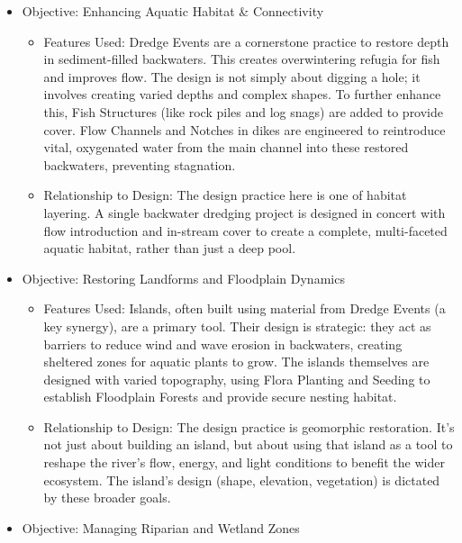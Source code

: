 \documentclass[
  letterpaper,
  DIV=11,
  numbers=noendperiod]{scrreprt}
\begin{document}
\begin{itemize}
\item
  Objective: Enhancing Aquatic Habitat \& Connectivity

  \begin{itemize}
  \item
    Features Used: Dredge Events are a cornerstone practice to restore
    depth in sediment-filled backwaters. This creates overwintering
    refugia for fish and improves flow. The design is not simply about
    digging a hole; it involves creating varied depths and complex
    shapes. To further enhance this, Fish Structures (like rock piles
    and log snags) are added to provide cover. Flow Channels and Notches
    in dikes are engineered to reintroduce vital, oxygenated water from
    the main channel into these restored backwaters, preventing
    stagnation.
  \item
    Relationship to Design: The design practice here is one of habitat
    layering. A single backwater dredging project is designed in concert
    with flow introduction and in-stream cover to create a complete,
    multi-faceted aquatic habitat, rather than just a deep pool.
  \end{itemize}
\item
  Objective: Restoring Landforms and Floodplain Dynamics

  \begin{itemize}
  \item
    Features Used: Islands, often built using material from Dredge
    Events (a key synergy), are a primary tool. Their design is
    strategic: they act as barriers to reduce wind and wave erosion in
    backwaters, creating sheltered zones for aquatic plants to grow. The
    islands themselves are designed with varied topography, using Flora
    Planting and Seeding to establish Floodplain Forests and provide
    secure nesting habitat.
  \item
    Relationship to Design: The design practice is geomorphic
    restoration. It's not just about building an island, but about using
    that island as a tool to reshape the river's flow, energy, and light
    conditions to benefit the wider ecosystem. The island's design
    (shape, elevation, vegetation) is dictated by these broader goals.
  \end{itemize}
\item
  Objective: Managing Riparian and Wetland Zones


\end{itemize}
\end{document}
